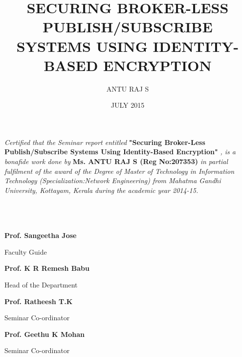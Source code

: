 \documentclass[MTech]{iitmdiss}
\begin{document}
\nocite{*}
\setcounter{equation}{1}


\title{SECURING BROKER-LESS PUBLISH/SUBSCRIBE SYSTEMS USING IDENTITY-BASED ENCRYPTION}
\author{ANTU RAJ S}

\date{JULY 2015}

\maketitle

\certificate
\vspace*{0.2in}
\noindent 
 \textit{Certified that the Seminar report entitled
} \textbf{"Securing Broker-Less Publish/Subscribe
Systems Using Identity-Based Encryption"}\textit{ , is a bonafide work done by }\textbf{Ms. ANTU RAJ S (Reg No:207353)}\textit{ in partial fulfilment of the award of the Degree of Master of Technology in Information Technology (Specialization:Network Engineering) from Mahatma Gandhi University, Kottayam, Kerala during the academic year 2014-15.}
\\ \\ \\ \\
\vspace*{1.2in}
\hspace{.25in}
\begin{minipage}{0.18\textwidth}
\centerline{\bf Prof. Sangeetha Jose} 
\centerline{Faculty Guide} 
\end{minipage}
\begin{minipage}{.5\textwidth}
\hspace{0.15\textwidth}
\end{minipage}
\begin{minipage}{0.18\textwidth}
\centerline{\bf Prof. K R Remesh Babu} 
\centerline{Head of the Department} 
\end{minipage}
\newline
\vspace{.2in}
\hspace{.25in}
\begin{minipage}{0.18\textwidth}
 \centerline{\bf Prof. Ratheesh T.K}
 \centerline{Seminar Co-ordinator}
\end{minipage}
\begin{minipage}{.5\textwidth}
\hspace{0.15\textwidth}
\end{minipage}
\begin{minipage}{0.18\textwidth}
\centerline{\bf Prof. Geethu K Mohan}
 \centerline{Seminar Co-ordinator}
\end{minipage}
 \vspace{3pt}
\end{document}
